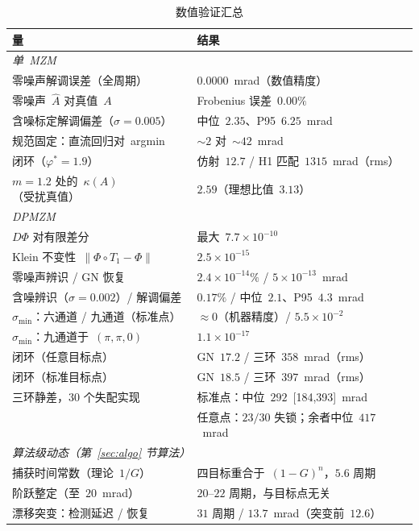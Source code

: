 \documentclass[11pt,journal,onecolumn]{IEEEtran}
\theoremstyle{plain}
\theoremstyle{remark}
\begin{document}
\begin{table}[!t]
\caption{数值验证汇总}
\label{tab:results}
\centering
\footnotesize
\setlength{\tabcolsep}{5pt}
\begin{tabular}{ll}
\toprule
量 & 结果\\
\midrule
\multicolumn{2}{l}{\emph{单~MZM}}\\
零噪声解调误差（全周期） & $0.0000$~mrad（数值精度）\\
零噪声~$\hat A$ 对真值~$A$ & Frobenius 误差~$0.00\%$\\
含噪标定解调偏差（$\sigma{=}0.005$） & 中位~$2.35$、P95~$6.25$~mrad\\
规范固定：直流回归对~argmin & ${\sim}2$ 对~${\sim}42$~mrad\\
闭环（$\varphi^\ast{=}1.9$） & 仿射~$12.7$ / H1 匹配~$1315$~mrad（rms）\\
$m{=}1.2$ 处的~$\kappa(A)$（受扰真值） & $2.59$（理想比值~$3.13$）\\
\midrule
\multicolumn{2}{l}{\emph{DPMZM}}\\
$D\Phi$ 对有限差分 & 最大~$7.7\times10^{-10}$\\
Klein 不变性~$\|\Phi\circ T_1-\Phi\|$ & $2.5\times10^{-15}$\\
零噪声辨识 / GN 恢复 & $2.4\times10^{-14}\%$ / $5\times10^{-13}$~mrad\\
含噪辨识（$\sigma{=}0.002$）/ 解调偏差 & $0.17\%$ / 中位~$2.1$、P95~$4.3$~mrad\\
$\sigma_{\min}$：六通道 / 九通道（标准点） & $\approx 0$（机器精度）/ $5.5\times10^{-2}$\\
$\sigma_{\min}$：九通道于~$(\pi,\pi,0)$ & $1.1\times10^{-17}$\\
闭环（任意目标点） & GN~$17.2$ / 三环~$358$~mrad（rms）\\
闭环（标准目标点） & GN~$18.5$ / 三环~$397$~mrad（rms）\\
三环静差，30 个失配实现 & 标准点：中位~$292$~[184,393]~mrad\\
 & 任意点：$23/30$ 失锁；余者中位~$417$~mrad\\
\midrule
\multicolumn{2}{l}{\emph{算法级动态（第~\ref{sec:algo} 节算法）}}\\
捕获时间常数（理论~$1/G$） & 四目标重合于~$(1-G)^n$，$5.6$ 周期\\
阶跃整定（至~$20$~mrad） & $20$--$22$ 周期，与目标点无关\\
漂移突变：检测延迟 / 恢复 & $31$ 周期 / $13.7$~mrad（突变前~$12.6$）\\
\bottomrule
\end{tabular}
\end{table}
\end{document}
